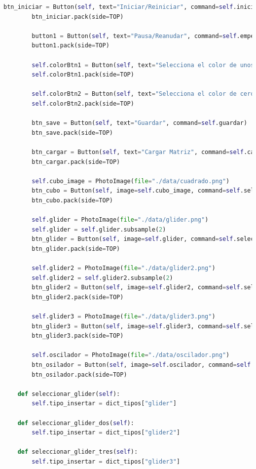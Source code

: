 \begin{lstlisting}[language=Python]
        btn_iniciar = Button(self, text="Iniciar/Reiniciar", command=self.iniciar)
        btn_iniciar.pack(side=TOP)

        button1 = Button(self, text="Pausa/Reanudar", command=self.empezar_dentener)
        button1.pack(side=TOP)

        self.colorBtn1 = Button(self, text="Selecciona el color de unos", command=self.get_color_unos, bg=self.unos)
        self.colorBtn1.pack(side=TOP)

        self.colorBtn2 = Button(self, text="Selecciona el color de ceros", command=self.get_color_ceros, bg=self.ceros)
        self.colorBtn2.pack(side=TOP)

        btn_save = Button(self, text="Guardar", command=self.guardar)
        btn_save.pack(side=TOP)

        btn_cargar = Button(self, text="Cargar Matriz", command=self.cargar)
        btn_cargar.pack(side=TOP)

        self.cubo_image = PhotoImage(file="./data/cuadrado.png")
        btn_cubo = Button(self, image=self.cubo_image, command=self.seleccionar_cubo)
        btn_cubo.pack(side=TOP)

        self.glider = PhotoImage(file="./data/glider.png")
        self.glider = self.glider.subsample(2)
        btn_glider = Button(self, image=self.glider, command=self.seleccionar_glider)
        btn_glider.pack(side=TOP)

        self.glider2 = PhotoImage(file="./data/glider2.png")
        self.glider2 = self.glider2.subsample(2)
        btn_glider2 = Button(self, image=self.glider2, command=self.seleccionar_glider_dos)
        btn_glider2.pack(side=TOP)

        self.glider3 = PhotoImage(file="./data/glider3.png")
        btn_glider3 = Button(self, image=self.glider3, command=self.seleccionar_glider_tres)
        btn_glider3.pack(side=TOP)

        self.oscilador = PhotoImage(file="./data/oscilador.png")
        btn_osilador = Button(self, image=self.oscilador, command=self.seleccionar_oscilador)
        btn_osilador.pack(side=TOP)

    def seleccionar_glider(self):
        self.tipo_insertar = dict_tipos["glider"]

    def seleccionar_glider_dos(self):
        self.tipo_insertar = dict_tipos["glider2"]

    def seleccionar_glider_tres(self):
        self.tipo_insertar = dict_tipos["glider3"]


\end{lstlisting}
